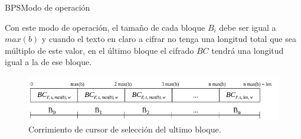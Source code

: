 \begin{frame}{BPS}{Modo de operación}

  Con este modo de operación, el tamaño de cada bloque $B_i$ debe ser igual 
  a $max(b)$ y cuando el texto en claro a cifrar no tenga una longitud total 
  que sea múltiplo de este valor, en el último bloque el cifrado $BC$ tendrá 
  una longitud igual a la de ese bloque.

  \begin{figure}[H]
    \begin{center}
      \includegraphics[width=0.9\linewidth]
        {../../../diagramas_comunes/bps/cursor_bps}
      \caption{Corrimiento de cursor de selección del ultimo bloque.}
     \end{center}
  \end{figure}

\end{frame}

